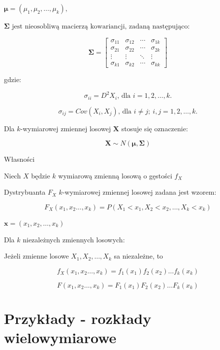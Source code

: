 \documentclass[
  letterpaper,
  DIV=11,
  numbers=noendperiod]{scrreprt}
\begin{document}
\(\boldsymbol{\mu}=(\mu_1,\mu_2,\ldots,\mu_k),\)

\(\mathbf{\Sigma} \text{ jest nieosobliwą macierzą kowariancji, zadaną następująco:}\)

\[
\boldsymbol{\Sigma} =
\begin{bmatrix}
\sigma_{11} & \sigma_{12} & \cdots & \sigma_{1k} \\
\sigma_{21} & \sigma_{22} & \cdots & \sigma_{2k} \\
\vdots & \vdots & \ddots & \vdots \\
\sigma_{k1} & \sigma_{k2} & \cdots & \sigma_{kk}
\end{bmatrix}
\]

gdzie:

\[\sigma_{ii} =D^2 X_i \text{, dla } i = 1, 2, \ldots, k.\]

\[\sigma_{ij}=Cov(X_i,X_j) \text{, dla } i \neq j; \  i,j = 1, 2, \ldots, k.\]

Dla \(k\)-wymiarowej zmiennej losowej \(\mathbf{X}\) stosuje się
oznaczenie:

\[\boldsymbol{X} \sim N(\boldsymbol{\mu},\boldsymbol{\Sigma})\]

Własności

Niech \(X\) będzie \(k\) wymiarową zmienną losową o gęstości \(f_X\)

Dystrybuanta \(F_X\) \(k\)-wymiarowej zmiennej losowej zadana jest
wzorem:

\[F_X(x_1,x_2\ldots,x_k)=P(X_1<x_1, X_2<x_2,\ldots , X_k <x_k)\]

\(\boldsymbol{x}=(x_1,x_2,\ldots,x_k)\)

Dla \(k\) niezależnych zmiennych losowych:

Jeżeli zmienne losowe \(X_1, X_2, \dots, X_k\) sa niezależne, to

\[f_X(x_1,x_2\ldots,x_k)=f_1(x_1)f_2(x_2)\ldots f_k(x_k)\]

\[F(x_1,x_2\ldots,x_k)=F_1(x_1)F_2(x_2)\ldots F_k(x_k)\]

\section{Przykłady - rozkłady
wielowymiarowe}\label{przykux142ady---rozkux142ady-wielowymiarowe}

\begin{tcolorbox}[enhanced jigsaw, toprule=.15mm, title=\textcolor{quarto-callout-tip-color}{\faLightbulb}\hspace{0.5em}{Przykład 6.1.}, breakable, coltitle=black, titlerule=0mm, colbacktitle=quarto-callout-tip-color!10!white, opacitybacktitle=0.6, opacityback=0, bottomtitle=1mm, left=2mm, arc=.35mm, leftrule=.75mm, bottomrule=.15mm, rightrule=.15mm, toptitle=1mm, colframe=quarto-callout-tip-color-frame, colback=white]

\end{tcolorbox}
\end{document}
